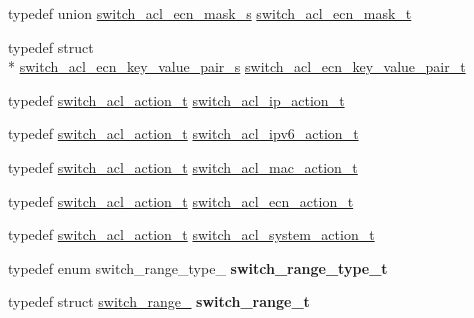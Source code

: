 \begin{DoxyCompactItemize}
\item 
typedef union \hyperlink{unionswitch__acl__ecn__mask__s}{switch\+\_\+acl\+\_\+ecn\+\_\+mask\+\_\+s} \hyperlink{group__ACL_gadc583e26c5778b4c802be3a206f01a01}{switch\+\_\+acl\+\_\+ecn\+\_\+mask\+\_\+t}
\item 
typedef struct \\*
\hyperlink{structswitch__acl__ecn__key__value__pair__s}{switch\+\_\+acl\+\_\+ecn\+\_\+key\+\_\+value\+\_\+pair\+\_\+s} \hyperlink{group__ACL_gabd89c32443f53679a1444992e1562930}{switch\+\_\+acl\+\_\+ecn\+\_\+key\+\_\+value\+\_\+pair\+\_\+t}
\item 
typedef \hyperlink{group__ACL_ga9e512fe793010aac7829bb2fbef4764d}{switch\+\_\+acl\+\_\+action\+\_\+t} \hyperlink{group__ACL_gab7f421bbb84792334752f0013c9577d4}{switch\+\_\+acl\+\_\+ip\+\_\+action\+\_\+t}
\item 
typedef \hyperlink{group__ACL_ga9e512fe793010aac7829bb2fbef4764d}{switch\+\_\+acl\+\_\+action\+\_\+t} \hyperlink{group__ACL_gad961512bfbd05e0d75cc0e114e8c16fa}{switch\+\_\+acl\+\_\+ipv6\+\_\+action\+\_\+t}
\item 
typedef \hyperlink{group__ACL_ga9e512fe793010aac7829bb2fbef4764d}{switch\+\_\+acl\+\_\+action\+\_\+t} \hyperlink{group__ACL_gadcc84d629bc45eb1aad21004643ee6c4}{switch\+\_\+acl\+\_\+mac\+\_\+action\+\_\+t}
\item 
typedef \hyperlink{group__ACL_ga9e512fe793010aac7829bb2fbef4764d}{switch\+\_\+acl\+\_\+action\+\_\+t} \hyperlink{group__ACL_ga9b8a32f2225ad06afd4ed79c4b0428d2}{switch\+\_\+acl\+\_\+ecn\+\_\+action\+\_\+t}
\item 
typedef \hyperlink{group__ACL_ga9e512fe793010aac7829bb2fbef4764d}{switch\+\_\+acl\+\_\+action\+\_\+t} \hyperlink{group__ACL_gaaa0b586aa6dbbc36517c01ee12d8d0a7}{switch\+\_\+acl\+\_\+system\+\_\+action\+\_\+t}
\item 
\hypertarget{group__ACL_gaa0c85b9a42d41e372bfac49ed74fde74}{typedef enum switch\+\_\+range\+\_\+type\+\_\+ {\bfseries switch\+\_\+range\+\_\+type\+\_\+t}}\label{group__ACL_gaa0c85b9a42d41e372bfac49ed74fde74}

\item 
\hypertarget{group__ACL_gab1f21211d64e5da1c5a7479beacf5eea}{typedef struct \hyperlink{structswitch__range__}{switch\+\_\+range\+\_\+} {\bfseries switch\+\_\+range\+\_\+t}}\label{group__ACL_gab1f21211d64e5da1c5a7479beacf5eea}

\end{DoxyCompactItemize}
